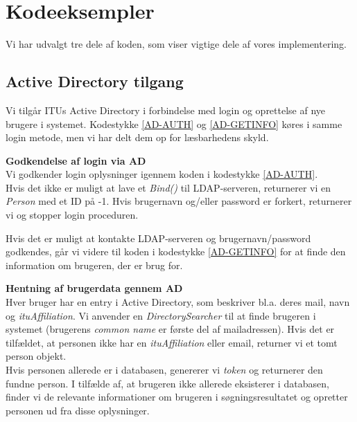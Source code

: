 \section{Kodeeksempler}
\label{Technical_CodeExamples}
Vi har udvalgt tre dele af koden, som viser vigtige dele af vores implementering.
\subsection*{Active Directory tilgang}
\label{Technical_CodeExamples_AD}
Vi tilgår ITUs Active Directory i forbindelse med login og oprettelse af nye brugere i systemet. Kodestykke \ref{AD-AUTH} og \ref{AD-GETINFO} køres i samme login metode, men vi har delt dem op for læsbarhedens skyld.

\textbf{Godkendelse af login via AD}
\\Vi godkender login oplysninger igennem koden i kodestykke \ref{AD-AUTH}. 
\\Hvis det ikke er muligt at lave et \textit{Bind()} til LDAP-serveren, returnerer vi en \textit{Person} med et ID på -1. Hvis brugernavn og/eller password er forkert, returnerer vi og stopper login proceduren.



Hvis det er muligt at kontakte LDAP-serveren og brugernavn/password godkendes, går vi videre til koden i kodestykke \ref{AD-GETINFO} for at finde den information om brugeren, der er brug for.

\textbf{Hentning af brugerdata gennem AD}
\\Hver bruger har en entry i Active Directory, som beskriver bl.a. deres mail, navn og \textit{ituAffiliation}. Vi anvender en \textit{DirectorySearcher} til at finde brugeren i systemet (brugerens \textit{common name} er første del af mailadressen). Hvis  det er tilfældet, at personen ikke har en \textit{ituAffiliation} eller email, returner vi et tomt person objekt.
\\Hvis personen allerede er i databasen, genererer vi \textit{token} og returnerer den fundne person. I tilfælde af, at brugeren ikke allerede eksisterer i databasen, finder vi de relevante informationer om brugeren i søgningsresultatet og opretter personen ud fra disse oplysninger.



